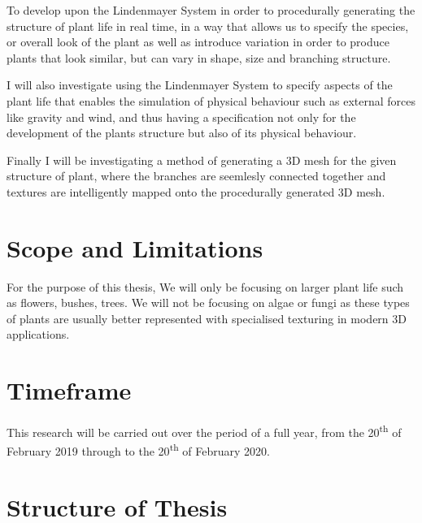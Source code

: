 \begin{flushleft}

To develop upon the Lindenmayer System in order to procedurally generating the structure of plant life in real time, in a way that allows us to specify the species, or overall look of the plant as well as introduce variation in order to produce plants that look similar, but can vary in shape, size and branching structure. \\

\vspace{5mm}

I will also investigate using the Lindenmayer System to specify aspects of the plant life that enables the simulation of physical behaviour such as external forces like gravity and wind, and thus having a specification not only for the development of the plants structure but also of its physical behaviour. \\

\vspace{5mm}

Finally I will be investigating a method of generating a 3D mesh for the given structure of plant, where the branches are seemlesly connected together and textures are intelligently mapped onto the procedurally generated 3D mesh.\\ 

\end{flushleft} 


\section{Scope and Limitations}

\begin{flushleft}

For the purpose of this thesis, We will only be focusing on larger plant life such as flowers, bushes, trees. We will not be focusing on algae or fungi as these types of plants are usually better represented with specialised texturing in modern 3D applications.\\

\vspace{5mm}



\end{flushleft}

\section{Timeframe}

\begin{flushleft}

This research will be carried out over the period of a full year, from the 20\textsuperscript{th} of February 2019 through to the 20\textsuperscript{th} of February 2020. 

\end{flushleft}

\section{Structure of Thesis}




